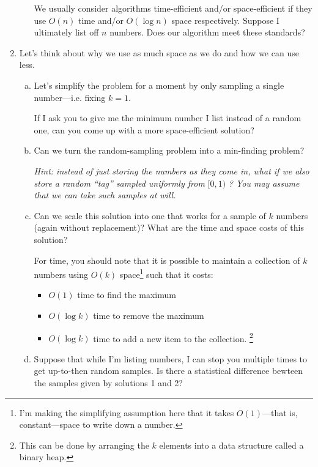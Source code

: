 \documentclass{article}
\begin{document}
\begin{enumerate}[1.]
\begin{enumerate}[a.]
    \smallskip

    We usually consider algorithms time-efficient and/or space-efficient if they
    use $O(n)$ time and/or $O(\log n)$ space respectively. Suppose I ultimately
    list off $n$ numbers. Does our algorithm meet these standards?
  \end{enumerate}

\clearpage
\item %
  Let's think about why we use as much space as we do and how we can use less.
  
  \begin{enumerate}[a.]
  \item %
    Let's simplify the problem for a moment by only sampling a single
    number---i.e. fixing $k=1$.

    If I ask you to give me the minimum number I list instead of a random one,
    can you come up with a more space-efficient solution?

  \item %
    Can we turn the random-sampling problem into a min-finding problem?

    \smallskip

    \textit{Hint: instead of just storing the numbers as they come in, what if
      we also store a random ``tag'' sampled uniformly from} $[0, 1)$
    \textit{? You may assume that we can take such samples at will.}

  \item %
    Can we scale this solution into one that works for a sample of $k$ numbers
    (again without replacement)? What are the time and space costs of this
    solution?

    For time, you should note that it is possible to maintain a collection of
    $k$ numbers using $O(k)$ space\footnote{I'm making the simplifying
      assumption here that it takes $O(1)$---that is, constant---space to write
      down a number.} such that it costs:
    \begin{itemize}
    \item $O(1)$ time to find the maximum
    \item $O(\log k)$ time to remove the maximum
    \item $O(\log k)$ time to add a new item to the collection.
      \footnote{This can be done by arranging the $k$ elements into a data structure called a binary heap.}
    \end{itemize}

  \item %
    Suppose that while I'm listing numbers, I can stop you multiple times to get
    up-to-then random samples. Is there a statistical difference bewteen the
    samples given by solutions 1 and 2?
  \end{enumerate}


\end{enumerate}
\end{document}

